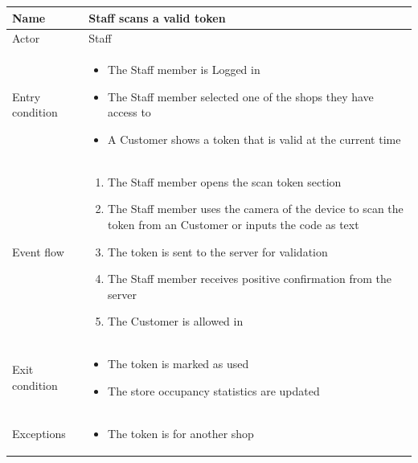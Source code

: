\begin{table}[H]
    \begin{tabu} to \textwidth {|X|X[4]|}
        \hline
        Name            & Staff scans a valid token  \\ \hline
        Actor           & Staff                      \\ \hline
        Entry condition & \begin{itemize}
            \item The Staff member is Logged in
            \item The Staff member selected one of the shops they have access to
            \item A Customer shows a token that is valid at the current time
        \end{itemize} \\ \hline
        Event flow      & \begin{enumerate}
            \item The Staff member opens the scan token section
            \item The Staff member uses the camera of the device to scan the token from an Customer or inputs the code as text
            \item The token is sent to the server for validation
            \item The Staff member receives positive confirmation from the server
            \item The Customer is allowed in
        \end{enumerate} \\ \hline
        Exit condition  & \begin{itemize}
            \item The token is marked as used
            \item The store occupancy statistics are updated
        \end{itemize} \\ \hline
        Exceptions      & \begin{itemize}
            \item The token is for another shop
        \end{itemize} \\ \hline
    \end{tabu}
\end{table}


